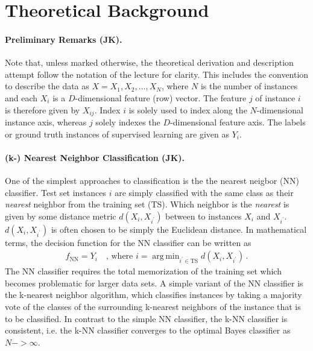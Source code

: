 \documentclass[12pt, a4paper]{scrartcl}
\DeclareMathOperator*{\argmin}{arg\,min}
\begin{document}
\section{Theoretical Background}
\label{sec:theo}

\paragraph{Preliminary Remarks (JK).} Note that, unless marked otherwise, the theoretical derivation and description attempt follow the notation of the lecture \cite{kothe2018foml} for clarity.
This includes the convention to describe the data as $X = { X_1, X_2, \dots, X_N}$, where $N$ is the number of instances and each $X_i$ is a $D$-dimensional feature (row) vector. The feature $j$ of instance $i$ is therefore given by $X_{ij}$.  Index $i$ is solely used to index along the $N$-dimensional instance axis, whereas $j$ solely indexes the $D$-dimensional feature axis. The labels or ground truth instances of supervised learning are given as $Y_i$.

\paragraph{(k-) Nearest Neighbor Classification (JK).} One of the simplest approaches to classification is the the nearest neigbor (NN) classifier. Test set instances $i$ are simply classified with the same class as their \emph{nearest} neighbor from the training set (TS). 
Which neighbor is the \emph{nearest} is given by some distance metric $d(X_i, X_{i^\prime})$ between to instances $X_i$ and $X_{i^\prime}$. $d(X_i, X_{i^\prime})$ is often chosen to be simply the Euclidean distance.
In mathematical terms, the decision function for the NN classifier can be written as
\begin{align*}
	f_{\mathrm{NN}} = Y_i \quad \text{, where } i = \argmin_{i^\prime \in \mathrm{TS}} d(X_i, X_{i^\prime}) \, .
\end{align*}
The NN classifier requires the total memorization of the training set which becomes problematic for larger data sets.
A simple variant of the NN classifier is the k-nearest neighbor algorithm, which classifies instances by taking a majority vote of the classes of the surrounding k-nearest neighbors of the instance that is to be classified. In contrast to the simple NN classifier, the k-NN classifier is consistent, i.e. the k-NN classifier converges to the optimal Bayes classifier as $N->\infty$.
\end{document}
